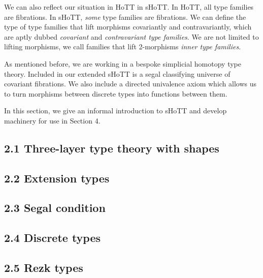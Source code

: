 \documentclass{article}
\theoremstyle{named}
\theoremstyle{remark}
\theoremstyle{definition}
\begin{document}
We can also reflect our situation in HoTT in sHoTT. In HoTT, all type families are fibrations. In sHoTT, \textit{some} type families are fibrations. We can define the type of type families that lift morphisms covariantly and contravariantly, which are aptly dubbed \textit{covariant} and \textit{contravariant type families}. We are not limited to lifting morphisms, we call families that lift 2-morphisms \textit{inner type families}. 

As mentioned before, we are working in a bespoke simplicial homotopy type theory. Included in our extended sHoTT is a segal classifying universe of covariant fibrations. We also include a directed univalence axiom which allows us to turn morphisms between discrete types into functions between them. 

In this section, we give an informal introduction to sHoTT and develop machinery for use in Section 4.
\subsection*{2.1 Three-layer type theory with shapes}

\setcounter{theorem}{0}


\subsection*{2.2 Extension types}

\setcounter{theorem}{0}


\subsection*{2.3 Segal condition}

\setcounter{theorem}{0}

\subsection*{2.4 Discrete types}

\setcounter{theorem}{0}

\subsection*{2.5 Rezk types}

\setcounter{theorem}{0}
\end{document}
